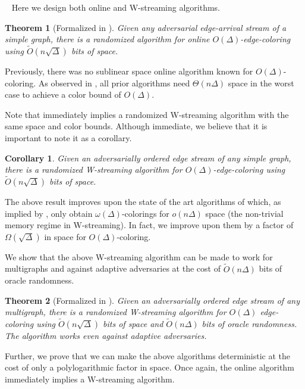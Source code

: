 \documentclass[10pt]{article}
\newtheorem{theorem}{Theorem}[section]
\newtheorem{corollary}[lemma]{Corollary}
\theoremstyle{definition}\newtheorem{definition}[lemma]{Definition}
\theoremstyle{remark}  \newtheorem*{remark}{Remark}
\newcommand{\tO}{\widetilde{O}}
\newcommand{\mypar}[1]{\medskip\noindent{\bfseries #1.}~}
\begin{document}
\mypar{Edge-arrival model} Here we design both online and W-streaming algorithms. 

\begin{theorem}[Formalized in ]\label{thm:online-rand-ea-edgecol}
  Given any adversarial edge-arrival stream of a simple graph, there is a randomized algorithm for online $O(\Delta)$-edge-coloring using $\tO(n \sqrt{\Delta})$ bits of space. %
\end{theorem}

Previously, there was no sublinear space online algorithm known for $O(\Delta)$-coloring. As observed in , all prior algorithms need $\Theta(n\Delta)$ space in the worst case to achieve a color bound of $O(\Delta)$.

Note that  immediately implies a randomized W-streaming algorithm with the same space and color bounds. Although immediate, we believe that it is important to note it as a corollary.

\begin{corollary}\label{cor:wstream-rand-ea}
Given an adversarially ordered edge stream of any simple graph, there is a randomized W-streaming algorithm for $O(\Delta)$-edge-coloring using $\tO(n \sqrt{\Delta})$ bits of space.
\end{corollary}

The above result improves upon the state of the art algorithms of \cite{CharikarL21,AnsariSZ22} which, as implied by , only obtain $\omega(\Delta)$-colorings for $o(n\Delta)$ space (the non-trivial memory regime in W-streaming). In fact, we improve upon them by a factor of $\Omega(\sqrt{\Delta})$ in space for $O(\Delta)$-coloring.

We show that the above W-streaming algorithm can be made to work for multigraphs and against adaptive adversaries at the cost of $\tO(n\Delta)$ bits of oracle randomness.

\begin{theorem}[Formalized in ]\label{thm:Wstream-rand-ea-edgecol}
  Given an adversarially ordered edge stream of any multigraph, there is a randomized W-streaming algorithm for $O(\Delta)$ edge-coloring using $\tO(n \sqrt{\Delta})$ bits of space and $\tO(n\Delta)$ bits of oracle randomness. The algorithm works even against adaptive adversaries.  
\end{theorem}


Further, we prove that we can make the above algorithms deterministic at the cost of only a polylogarithmic factor in space. Once again, the online algorithm immediately implies a W-streaming algorithm.  
\end{document}
